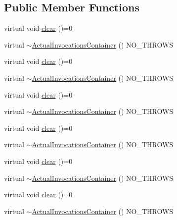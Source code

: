 \subsection*{Public Member Functions}
\begin{DoxyCompactItemize}
\item 
virtual void \mbox{\hyperlink{structfakeit_1_1ActualInvocationsContainer_ab0af1e59028b53f8258b713f89bfdcbe}{clear}} ()=0
\item 
virtual \mbox{\hyperlink{structfakeit_1_1ActualInvocationsContainer_ac7fa0ac80cc23f8c00dddb7901e452c3}{$\sim$\+Actual\+Invocations\+Container}} () N\+O\+\_\+\+T\+H\+R\+O\+WS
\item 
virtual void \mbox{\hyperlink{structfakeit_1_1ActualInvocationsContainer_ab0af1e59028b53f8258b713f89bfdcbe}{clear}} ()=0
\item 
virtual \mbox{\hyperlink{structfakeit_1_1ActualInvocationsContainer_ac7fa0ac80cc23f8c00dddb7901e452c3}{$\sim$\+Actual\+Invocations\+Container}} () N\+O\+\_\+\+T\+H\+R\+O\+WS
\item 
virtual void \mbox{\hyperlink{structfakeit_1_1ActualInvocationsContainer_ab0af1e59028b53f8258b713f89bfdcbe}{clear}} ()=0
\item 
virtual \mbox{\hyperlink{structfakeit_1_1ActualInvocationsContainer_ac7fa0ac80cc23f8c00dddb7901e452c3}{$\sim$\+Actual\+Invocations\+Container}} () N\+O\+\_\+\+T\+H\+R\+O\+WS
\item 
virtual void \mbox{\hyperlink{structfakeit_1_1ActualInvocationsContainer_ab0af1e59028b53f8258b713f89bfdcbe}{clear}} ()=0
\item 
virtual \mbox{\hyperlink{structfakeit_1_1ActualInvocationsContainer_ac7fa0ac80cc23f8c00dddb7901e452c3}{$\sim$\+Actual\+Invocations\+Container}} () N\+O\+\_\+\+T\+H\+R\+O\+WS
\item 
virtual void \mbox{\hyperlink{structfakeit_1_1ActualInvocationsContainer_ab0af1e59028b53f8258b713f89bfdcbe}{clear}} ()=0
\item 
virtual \mbox{\hyperlink{structfakeit_1_1ActualInvocationsContainer_ac7fa0ac80cc23f8c00dddb7901e452c3}{$\sim$\+Actual\+Invocations\+Container}} () N\+O\+\_\+\+T\+H\+R\+O\+WS
\item 
virtual void \mbox{\hyperlink{structfakeit_1_1ActualInvocationsContainer_ab0af1e59028b53f8258b713f89bfdcbe}{clear}} ()=0
\item 
virtual \mbox{\hyperlink{structfakeit_1_1ActualInvocationsContainer_ac7fa0ac80cc23f8c00dddb7901e452c3}{$\sim$\+Actual\+Invocations\+Container}} () N\+O\+\_\+\+T\+H\+R\+O\+WS
\item 

\end{DoxyCompactItemize}
